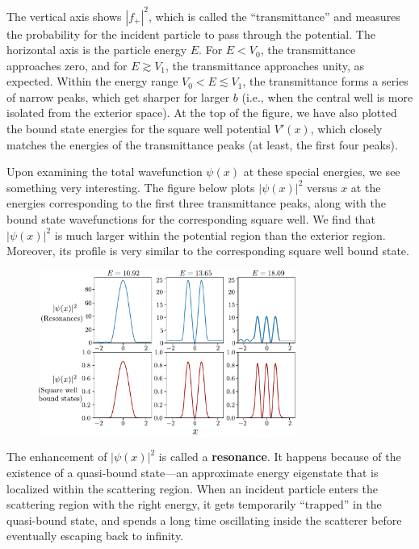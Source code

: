 \documentclass[pra,12pt]{revtex4}
\begin{document}
The vertical axis shows $|f_+|^2$, which is called the
``transmittance'' and measures the probability for the incident
particle to pass through the potential.  The horizontal axis is the
particle energy $E$.  For $E < V_0$, the transmittance approaches
zero, and for $E \gtrsim V_1$, the transmittance approaches unity, as
expected.  Within the energy range $V_0 < E \lesssim V_1$, the
transmittance forms a series of narrow peaks, which get sharper for
larger $b$ (i.e., when the central well is more isolated from the
exterior space).  At the top of the figure, we have also plotted the
bound state energies for the square well potential $V'(x)$, which
closely matches the energies of the transmittance peaks (at least, the
first four peaks).

Upon examining the total wavefunction $\psi(x)$ at these special
energies, we see something very interesting.  The figure below plots
$|\psi(x)|^2$ versus $x$ at the energies corresponding to the first
three transmittance peaks, along with the bound state wavefunctions
for the corresponding square well.  We find that $|\psi(x)|^2$ is much
larger within the potential region than the exterior region.
Moreover, its profile is very similar to the corresponding square well
bound state.

\begin{figure}[h]
  \centering\includegraphics[width=0.75\textwidth]{resonancewavefunctions}
\end{figure}

The enhancement of $|\psi(x)|^2$ is called a \textbf{resonance}.  It
happens because of the existence of a quasi-bound state---an
approximate energy eigenstate that is localized within the scattering
region.  When an incident particle enters the scattering region with
the right energy, it gets temporarily ``trapped'' in the quasi-bound
state, and spends a long time oscillating inside the scatterer before
eventually escaping back to infinity.
\end{document}

